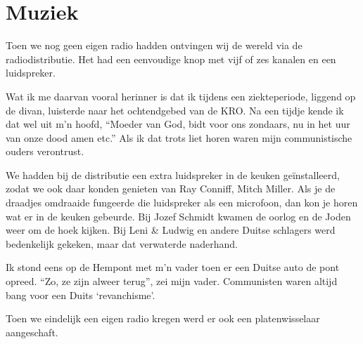 \documentclass[10pt,twoside, openright]{memoir}
\begin{document}
\section{Muziek} %
\label{cha:muziek}

Toen we nog geen eigen radio hadden ontvingen wij de wereld via de radiodistributie. Het had een eenvoudige knop met vijf of zes kanalen en een luidspreker. 

Wat ik me daarvan vooral herinner is dat ik tijdens een ziekteperiode, liggend op de divan, luisterde naar het ochtendgebed van de KRO. Na een tijdje kende ik dat wel uit m’n hoofd, ``Moeder van God, bidt voor ons zondaars, nu in het uur van onze dood amen etc.'' Als ik dat trots liet horen waren mijn communistische ouders verontrust. 

We hadden bij de distributie een extra luidspreker in de keuken geïnstalleerd, zodat we ook daar konden genieten van Ray Conniff, Mitch Miller. Als je de draadjes omdraaide fungeerde die luidspreker als een microfoon, dan kon je horen wat er in de keuken gebeurde. Bij Jozef Schmidt kwamen de oorlog en de Joden weer om de hoek kijken. Bij Leni \& Ludwig en andere Duitse schlagers werd bedenkelijk gekeken, maar dat verwaterde naderhand. 

Ik stond eens op de Hempont met m’n vader toen er een Duitse auto de pont opreed. ``Zo, ze zijn alweer terug'', zei mijn vader. Communisten waren altijd bang voor een Duits `revanchisme’.

Toen we eindelijk een eigen radio kregen werd er ook een platenwisselaar aangeschaft. 
\end{document}
